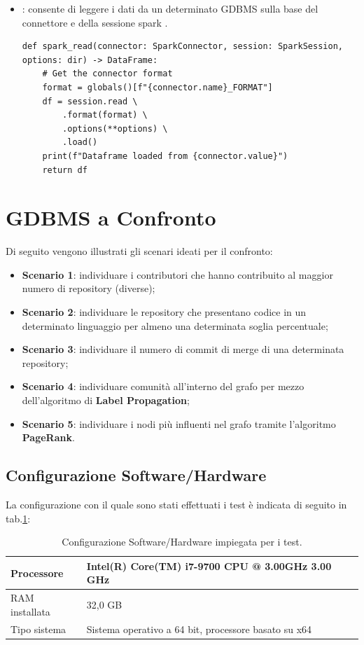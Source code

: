 \documentclass[11pt]{article}
\newcommand{\codeinline}[1]{\tcbox{\lstinline[style=inline]|#1|}}
\begin{document}
\begin{itemize}
    \item \codeinline{spark_read()}: consente di leggere i dati da un determinato GDBMS sulla base del connettore \codeinline{connector} e della sessione spark \codeinline{session}.
\begin{lstlisting}[style=PythonStyle, style=all]
def spark_read(connector: SparkConnector, session: SparkSession, options: dir) -> DataFrame:
    # Get the connector format
    format = globals()[f"{connector.name}_FORMAT"]
    df = session.read \
        .format(format) \
        .options(**options) \
        .load()
    print(f"Dataframe loaded from {connector.value}")
    return df
\end{lstlisting}
\end{itemize}

\section{GDBMS a Confronto}
Di seguito vengono illustrati gli scenari ideati per il confronto:
\begin{itemize}
    \item \textbf{Scenario 1}: individuare i contributori che hanno contribuito al maggior numero di repository (diverse);
    \item \textbf{Scenario 2}: individuare le repository che presentano codice in un determinato linguaggio per almeno una determinata soglia percentuale;
    \item \textbf{Scenario 3}: individuare il numero di commit di merge di una determinata repository;
    \item \textbf{Scenario 4}: individuare comunità all'interno del grafo per mezzo dell'algoritmo di \textbf{Label Propagation}; 
    \item \textbf{Scenario 5}: individuare i nodi più influenti nel grafo tramite l'algoritmo \textbf{PageRank}. 
\end{itemize}
\subsection{Configurazione Software/Hardware}
La configurazione con il quale sono stati effettuati i test è indicata di seguito in tab.\ref{tab:config_SWHW}:
\begin{table}[!h]
    \centering
    \begin{tabular}{|l|l|}
        \hline
        Processore & Intel(R) Core(TM) i7-9700 CPU @ 3.00GHz 3.00 GHz \\
        \hline
        RAM installata & 32,0 GB \\
        \hline
        Tipo sistema & Sistema operativo a 64 bit, processore basato su x64 \\
        \hline
    \end{tabular}
    \caption{Configurazione Software/Hardware impiegata per i test.}
    \label{tab:config_SWHW}
\end{table}
\end{document}
